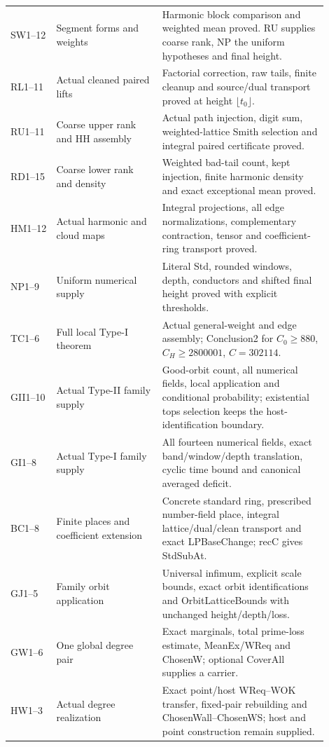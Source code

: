 \documentclass[11pt,a4paper]{article}
\numberwithin{equation}{section}
\theoremstyle{remark}\newtheorem{remark}[theorem]{Remark}
\begin{document}
\begin{longtable}{>{\raggedright\arraybackslash}p{0.13\linewidth}>{\raggedright\arraybackslash}p{0.30\linewidth}>{\raggedright\arraybackslash}p{0.47\linewidth}}
SW1--12 & Segment forms and weights & Harmonic block comparison and weighted mean proved. RU supplies coarse rank, NP the uniform hypotheses and final height.\\[3pt]
RL1--11 & Actual cleaned paired lifts & Factorial correction, raw tails, finite cleanup and source/dual transport proved at height $\lfloor t_0\rfloor$.\\[3pt]
RU1--11 & Coarse upper rank and HH assembly & Actual path injection, digit sum, weighted-lattice Smith selection and integral paired certificate proved.\\[3pt]
RD1--15 & Coarse lower rank and density & Weighted bad-tail count, kept injection, finite harmonic density and exact exceptional mean proved.\\[3pt]
HM1--12 & Actual harmonic and cloud maps & Integral projections, all edge normalizations, complementary contraction, tensor and coefficient-ring transport proved.\\[3pt]
NP1--9 & Uniform numerical supply & Literal Std, rounded windows, depth, conductors and shifted final height proved with explicit thresholds.\\[3pt]
TC1--6 & Full local Type-I theorem & Actual general-weight and edge assembly; Conclusion2 for $C_0\ge880$, $C_H\ge2800001$, $C=302114$.\\[3pt]
GII1--10 & Actual Type-II family supply & Good-orbit count, all numerical fields, local application and conditional probability; existential tops selection keeps the host-identification boundary.\\[3pt]
GI1--8 & Actual Type-I family supply & All fourteen numerical fields, exact band/window/depth translation, cyclic time bound and canonical averaged deficit.\\[3pt]
BC1--8 & Finite places and coefficient extension & Concrete standard ring, prescribed number-field place, integral lattice/dual/clean transport and exact LPBaseChange; recC gives StdSubAt.\\[3pt]
GJ1--5 & Family orbit application & Universal infimum, explicit scale bounds, exact orbit identifications and OrbitLatticeBounds with unchanged height/depth/loss.\\[3pt]
GW1--6 & One global degree pair & Exact marginals, total prime-loss estimate, MeanEx/WReq and ChosenW; optional CoverAll supplies a carrier.\\[3pt]
HW1--3 & Actual degree realization & Exact point/host WReq--WOK transfer, fixed-pair rebuilding and ChosenWall--ChosenWS; host and point construction remain supplied.\\[3pt]

\end{longtable}
\end{document}

